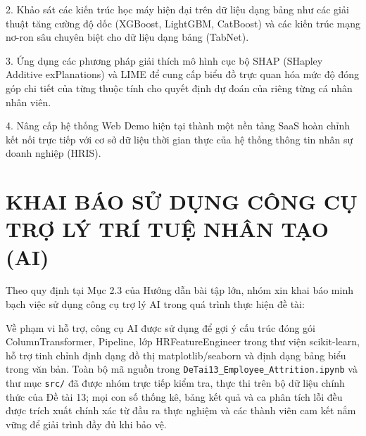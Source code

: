 \documentclass[12pt,a4paper]{article}
\begin{document}
2. Khảo sát các kiến trúc học máy hiện đại trên dữ liệu dạng bảng như các giải thuật tăng cường độ dốc (XGBoost, LightGBM, CatBoost) và các kiến trúc mạng nơ-ron sâu chuyên biệt cho dữ liệu dạng bảng (TabNet).

3. Ứng dụng các phương pháp giải thích mô hình cục bộ SHAP (SHapley Additive exPlanations) và LIME để cung cấp biểu đồ trực quan hóa mức độ đóng góp chi tiết của từng thuộc tính cho quyết định dự đoán của riêng từng cá nhân nhân viên.

4. Nâng cấp hệ thống Web Demo hiện tại thành một nền tảng SaaS hoàn chỉnh kết nối trực tiếp với cơ sở dữ liệu thời gian thực của hệ thống thông tin nhân sự doanh nghiệp (HRIS).

\newpage
\section{KHAI BÁO SỬ DỤNG CÔNG CỤ TRỢ LÝ TRÍ TUỆ NHÂN TẠO (AI)}
Theo quy định tại Mục 2.3 của Hướng dẫn bài tập lớn, nhóm xin khai báo minh bạch việc sử dụng công cụ trợ lý AI trong quá trình thực hiện đề tài:

Về phạm vi hỗ trợ, công cụ AI được sử dụng để gợi ý cấu trúc đóng gói ColumnTransformer, Pipeline, lớp HRFeatureEngineer trong thư viện scikit-learn, hỗ trợ tinh chỉnh định dạng đồ thị matplotlib/seaborn và định dạng bảng biểu trong văn bản. Toàn bộ mã nguồn trong \texttt{DeTai13\_Employee\_Attrition.ipynb} và thư mục \texttt{src/} đã được nhóm trực tiếp kiểm tra, thực thi trên bộ dữ liệu chính thức của Đề tài 13; mọi con số thống kê, bảng kết quả và ca phân tích lỗi đều được trích xuất chính xác từ đầu ra thực nghiệm và các thành viên cam kết nắm vững để giải trình đầy đủ khi bảo vệ.

\newpage


\end{document}
